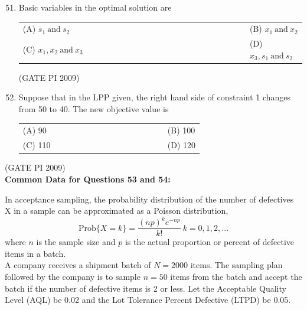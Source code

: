 \documentclass[journal,12pt,onecolumn]{IEEEtran}
\theoremstyle{remark}
\begin{document}
\begin{enumerate}[label=Q.\arabic*, leftmargin=*]
\setcounter{enumi}{50}

\item Basic variables in the optimal solution are
\begin{multicols}{2}
\begin{tabular}[t]{p{0.8\linewidth} p{0.9\linewidth}}
(A) $s_1\ \text{and}\ s_2$ & (B) $x_1\ \text{and}\ x_2$ \\
(C) $x_1, x_2\ \text{and}\ x_3$ & (D) $x_3, s_1\ \text{and}\ s_2$ \\
\end{tabular}
\end{multicols}
\hfill (GATE PI 2009)
\item Suppose that in the LPP given, the right hand side of constraint 1 changes from 50 to 40. The new objective value is
\begin{multicols}{2}
\begin{tabular}[t]{p{0.8\linewidth} p{0.9\linewidth}}
(A) 90 & (B) 100 \\
(C) 110 & (D) 120 \\
\end{tabular}
\end{multicols}
\end{enumerate}
\hfill (GATE PI 2009) \\
\textbf{Common Data for Questions 53 and 54:}


In acceptance sampling, the probability distribution of the number of defectives X in a sample can be approximated as a Poisson distribution,\\
$$\text{Prob}\{ X = k \} = \frac{(np)^k e^{-np}}{k!}\ k=0,1,2,...$$
where $n$ is the sample size and $p$ is the actual proportion or percent of defective items in a batch.\\

A company receives a shipment batch of $N = 2000$ items. The sampling plan followed by the company is to sample $n = 50$ items from the batch and accept the batch if the number of defective items is 2 or less. Let the Acceptable Quality Level (AQL) be 0.02 and the Lot Tolerance Percent Defective (LTPD) be 0.05.
\end{document}
